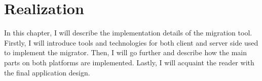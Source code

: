 \chapter{Realization}\label{cptr:realization}

In this chapter, I will describe the implementation details of the migration tool.
Firstly, I will introduce tools and technologies for both client and server side used to implement the migrator.
Then, I will go further and describe how the main parts on both platforms are implemented.
Lastly, I will acquaint the reader with the final application design.





